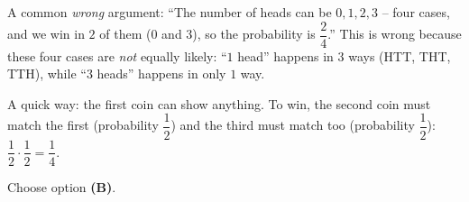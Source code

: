 {\begin{warnbox}A common \emph{wrong} argument: ``The number of heads can be $0,1,2,3$ -- four cases, and we win in $2$ of them ($0$ and $3$), so the probability is $\dfrac24$.'' This is wrong because these four cases are \emph{not} equally likely: ``$1$ head'' happens in $3$ ways (HTT, THT, TTH), while ``$3$ heads'' happens in only $1$ way.\end{warnbox}

\begin{tipbox}A quick way: the first coin can show anything. To win, the second coin must match the first (probability $\dfrac12$) and the third must match too (probability $\dfrac12$): $\dfrac12\cdot\dfrac12=\dfrac14$.\end{tipbox}

Choose option \textbf{(B)}.
}

